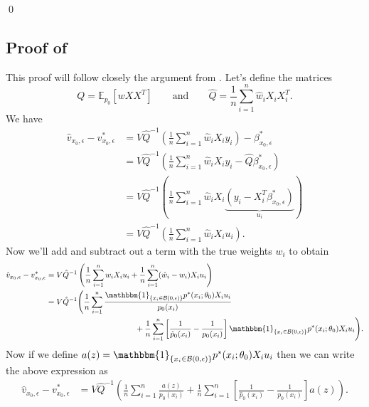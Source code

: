 \documentclass[11pt]{article}
\begin{document}
\qed{}

\subsection{Proof of } \label{sec: proof of velocity decomp}
This proof will follow closely the argument from \citet{Newey_Ruud_2005}. Let's define the matrices
\begin{equation*}
    Q = \mathbb{E}_{p_0}\left[wXX^T\right] \qquad \text{and} \qquad \hat{Q} = \frac{1}{n}\sum_{i = 1}^n\hat{w}_iX_iX_i^T.
\end{equation*}
We have
\begin{align*}
    \hat{v}_{x_0, \epsilon} - v^*_{x_0, \epsilon} &= V\hat{Q}^{-1}\left(\frac{1}{n}\sum_{i = 1}^n\hat{w}_iX_iy_i\right) - \beta^*_{x_0, \epsilon} \\
    &= V\hat{Q}^{-1}\left(\frac{1}{n}\sum_{i = 1}^n\hat{w}_iX_iy_i - \hat{Q}\beta^*_{x_0, \epsilon}\right) \\
    &= V\hat{Q}^{-1}\left(\frac{1}{n}\sum_{i = 1}^n\hat{w}_iX_i\underbrace{\left(y_i - X_i^T\beta^*_{x_0, \epsilon}\right)}_{u_i}\right) \\
    &= V\hat{Q}^{-1}\left(\frac{1}{n}\sum_{i = 1}^n\hat{w}_iX_iu_i\right).
\end{align*}
Now we'll add and subtract out a term with the true weights $w_i$ to obtain
\begin{align*}
    \hat{v}_{x_0, \epsilon} - v^*_{x_0, \epsilon} &= V\hat{Q}^{-1}\left(\frac{1}{n}\sum_{i = 1}^nw_iX_iu_i + \frac{1}{n}\sum_{i = 1}^n(\hat{w}_i - w_i)X_iu_i\right) \\
    &= V\hat{Q}^{-1}\Bigg(\frac{1}{n}\sum_{i = 1}^n\frac{\mathbbm{1}_{\{x_i \in \mathcal{B}(0, \epsilon)\}}p^*(x_i;\theta_0)X_iu_i}{p_0(x_i)} \\
    &\hspace{40mm}+ \frac{1}{n}\sum_{i = 1}^n\left[\frac{1}{\hat{p}_0(x_i)} - \frac{1}{p_0(x_i)}\right]\mathbbm{1}_{\{x_i \in \mathcal{B}(0, \epsilon)\}}p^*(x_i;\theta_0)X_iu_i\Bigg).
\end{align*}
Now if we define $a(z) = \mathbbm{1}_{\{x_i \in \mathcal{B}(0, \epsilon)\}}p^*(x_i;\theta_0)X_iu_i$ then we can write the above expression as
\begin{align*}
    \hat{v}_{x_0, \epsilon} - v^*_{x_0, \epsilon} &= V\hat{Q}^{-1}\left(\frac{1}{n}\sum_{i = 1}^n\frac{a(z)}{p_0(x_i)} + \frac{1}{n}\sum_{i = 1}^n\left[\frac{1}{\hat{p}_0(x_i)} - \frac{1}{p_0(x_i)}\right]a(z)\right).
\end{align*}
\end{document}
